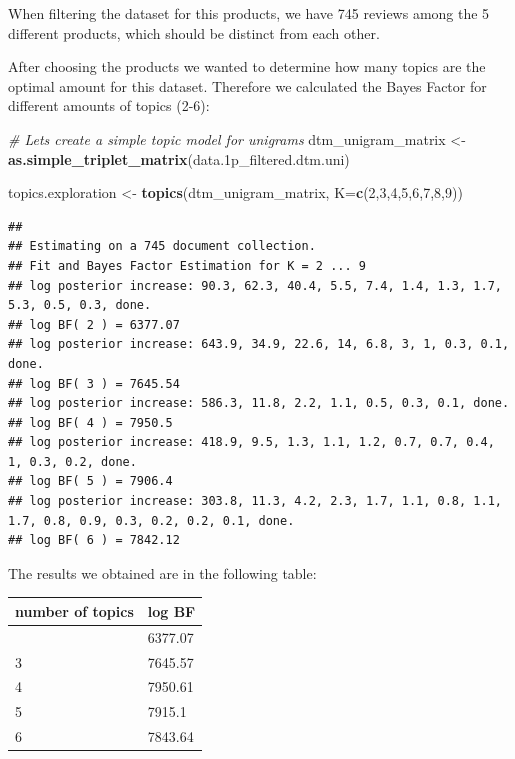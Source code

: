 \documentclass[
]{article}
\newenvironment{Shaded}{\begin{snugshade}}{\end{snugshade}}
\newcommand{\AttributeTok}[1]{\textcolor[rgb]{0.13,0.29,0.53}{#1}}
\newcommand{\CommentTok}[1]{\textcolor[rgb]{0.56,0.35,0.01}{\textit{#1}}}
\newcommand{\DecValTok}[1]{\textcolor[rgb]{0.00,0.00,0.81}{#1}}
\newcommand{\FloatTok}[1]{\textcolor[rgb]{0.00,0.00,0.81}{#1}}
\newcommand{\FunctionTok}[1]{\textcolor[rgb]{0.13,0.29,0.53}{\textbf{#1}}}
\newcommand{\NormalTok}[1]{#1}
\newcommand{\OtherTok}[1]{\textcolor[rgb]{0.56,0.35,0.01}{#1}}
\begin{document}
When filtering the dataset for this products, we have 745 reviews among
the 5 different products, which should be distinct from each other.

After choosing the products we wanted to determine how many topics are
the optimal amount for this dataset. Therefore we calculated the Bayes
Factor for different amounts of topics (2-6):

\begin{Shaded}
\begin{Highlighting}[]
\CommentTok{\# Lets create a simple topic model for unigrams}
\NormalTok{dtm\_unigram\_matrix }\OtherTok{\textless{}{-}} \FunctionTok{as.simple\_triplet\_matrix}\NormalTok{(data}\FloatTok{.1}\NormalTok{p\_filtered.dtm.uni)}

\NormalTok{topics.exploration }\OtherTok{\textless{}{-}} \FunctionTok{topics}\NormalTok{(dtm\_unigram\_matrix, }\AttributeTok{K=}\FunctionTok{c}\NormalTok{(}\DecValTok{2}\NormalTok{,}\DecValTok{3}\NormalTok{,}\DecValTok{4}\NormalTok{,}\DecValTok{5}\NormalTok{,}\DecValTok{6}\NormalTok{,}\DecValTok{7}\NormalTok{,}\DecValTok{8}\NormalTok{,}\DecValTok{9}\NormalTok{))}
\end{Highlighting}
\end{Shaded}

\begin{verbatim}
## 
## Estimating on a 745 document collection.
## Fit and Bayes Factor Estimation for K = 2 ... 9
## log posterior increase: 90.3, 62.3, 40.4, 5.5, 7.4, 1.4, 1.3, 1.7, 5.3, 0.5, 0.3, done.
## log BF( 2 ) = 6377.07
## log posterior increase: 643.9, 34.9, 22.6, 14, 6.8, 3, 1, 0.3, 0.1, done.
## log BF( 3 ) = 7645.54
## log posterior increase: 586.3, 11.8, 2.2, 1.1, 0.5, 0.3, 0.1, done.
## log BF( 4 ) = 7950.5
## log posterior increase: 418.9, 9.5, 1.3, 1.1, 1.2, 0.7, 0.7, 0.4, 1, 0.3, 0.2, done.
## log BF( 5 ) = 7906.4
## log posterior increase: 303.8, 11.3, 4.2, 2.3, 1.7, 1.1, 0.8, 1.1, 1.7, 0.8, 0.9, 0.3, 0.2, 0.2, 0.1, done.
## log BF( 6 ) = 7842.12
\end{verbatim}

The results we obtained are in the following table:

\begin{longtable}[]{@{}ll@{}}
\toprule\noalign{}
number of topics & log BF \\
\midrule\noalign{}
\endhead
\bottomrule\noalign{}
\endlastfoot
2 & 6377.07 \\
3 & 7645.57 \\
4 & 7950.61 \\
5 & 7915.1 \\
6 & 7843.64 \\
\end{longtable}
\end{document}
